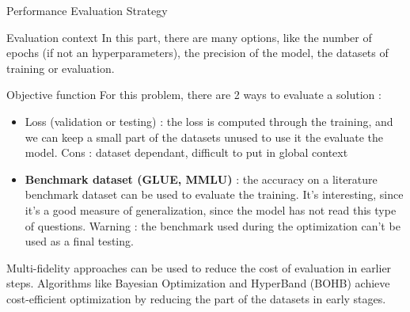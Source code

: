 \begin{frame}{Performance Evaluation Strategy}
    \begin{block}{Evaluation context}
    In this part, there are many options, like the number of epochs (if not an hyperparameters), the precision of the model, the datasets of training or evaluation. 
        
    \end{block}
    \begin{block}{Objective function}
        For this problem, there are 2 ways to evaluate a solution : 
        \begin{itemize}
            \item Loss (validation or testing) : the loss is computed through the training, and we can keep a small part of the datasets unused to use it the evaluate the model. Cons : dataset dependant, difficult to put in global context
            \item \textbf{Benchmark dataset (GLUE\cite{wang2018glue}, MMLU\cite{hendrycks2021mmlu})} : the accuracy on a literature benchmark dataset can be used to evaluate the training. It's interesting, since it's a good measure of generalization, since the model has not read this type of questions. Warning : the benchmark used during the optimization can't be used as a final testing. 
        \end{itemize}

        Multi-fidelity approaches can be used to reduce the cost of evaluation in earlier steps. Algorithms like Bayesian Optimization and HyperBand (BOHB\cite{DBLP:journals/corr/abs-1807-01774}) achieve cost-efficient optimization by reducing the part of the datasets in early stages.
    \end{block}
    
\end{frame}